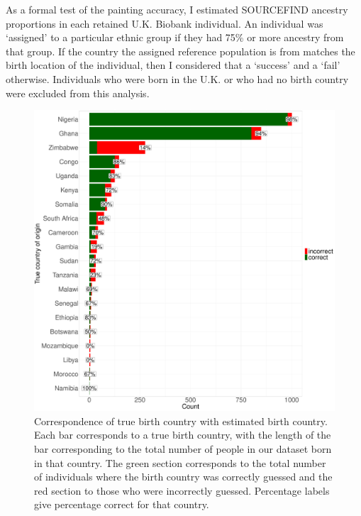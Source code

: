 As a formal test of the painting accuracy, I estimated SOURCEFIND ancestry proportions in each retained U.K. Biobank individual. An individual was `assigned' to a particular ethnic group if they had 75\% or more ancestry from that group. If the country the assigned reference population is from matches the birth location of the individual, then I considered that a `success' and a `fail' otherwise. Individuals who were born in the U.K. or who had no birth country were excluded from this analysis. 

\begin{figure}[htp]
    \centering
    \includegraphics[width=1.0\textwidth]{../images/chapter3/country_of_origin_allInds.pdf}
    \caption{Correspondence of true birth country with estimated birth country. Each bar corresponds to a true birth country, with the length of the bar corresponding to the total number of people in our dataset born in that country. The green section corresponds to the total number of individuals where the birth country was correctly guessed and the red section to those who were incorrectly guessed. Percentage labels give percentage correct for that country.}
    \label{fig:country_of_origin_allInds}
\end{figure}

